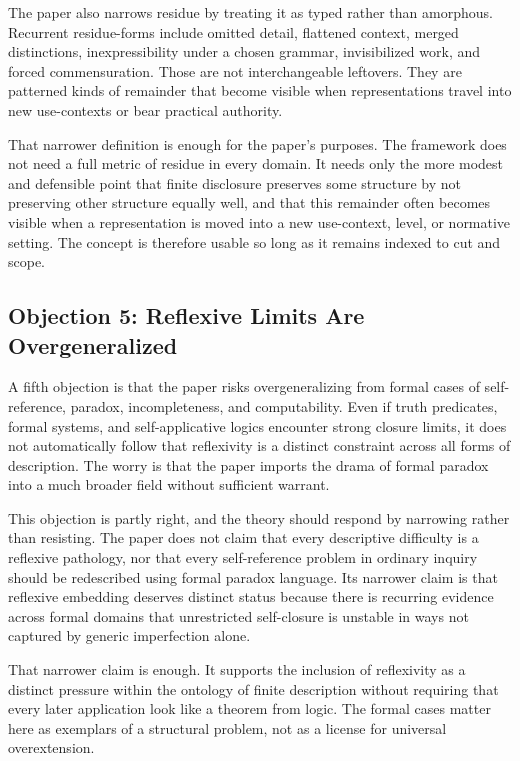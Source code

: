 \documentclass[11pt]{article}
\begin{document}
The paper also narrows residue by treating it as typed rather than amorphous. Recurrent residue-forms include omitted detail, flattened context, merged distinctions, inexpressibility under a chosen grammar, invisibilized work, and forced commensuration. Those are not interchangeable leftovers. They are patterned kinds of remainder that become visible when representations travel into new use-contexts or bear practical authority. \cite{espeland_stevens_quantification,merry_seductions_of_quantification,star_ethnography_of_infrastructure,bowker_star_sorting_things_out}

That narrower definition is enough for the paper's purposes. The framework does not need a full metric of residue in every domain. It needs only the more modest and defensible point that finite disclosure preserves some structure by not preserving other structure equally well, and that this remainder often becomes visible when a representation is moved into a new use-context, level, or normative setting. The concept is therefore usable so long as it remains indexed to cut and scope.

\subsection{Objection 5: Reflexive Limits Are Overgeneralized}

A fifth objection is that the paper risks overgeneralizing from formal cases of self-reference, paradox, incompleteness, and computability. Even if truth predicates, formal systems, and self-applicative logics encounter strong closure limits, it does not automatically follow that reflexivity is a distinct constraint across all forms of description. The worry is that the paper imports the drama of formal paradox into a much broader field without sufficient warrant.

This objection is partly right, and the theory should respond by narrowing rather than resisting. The paper does not claim that every descriptive difficulty is a reflexive pathology, nor that every self-reference problem in ordinary inquiry should be redescribed using formal paradox language. Its narrower claim is that reflexive embedding deserves distinct status because there is recurring evidence across formal domains that unrestricted self-closure is unstable in ways not captured by generic imperfection alone. \cite{bolander_self_reference_sep}

That narrower claim is enough. It supports the inclusion of reflexivity as a distinct pressure within the ontology of finite description without requiring that every later application look like a theorem from logic. The formal cases matter here as exemplars of a structural problem, not as a license for universal overextension.
\end{document}
